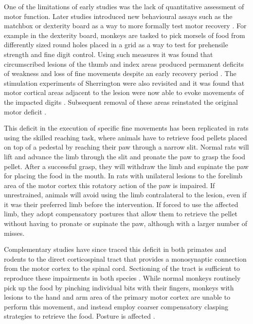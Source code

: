 One of the limitations of early studies was the lack of quantitative assessment of motor function. Later studies introduced new behavioural assays such as the matchbox or dexterity board as a way to more formally test motor recovery \cite{Glees1950,Cole1952}. For example in the dexterity board, monkeys are tasked to pick morsels of food from differently sized round holes placed in a grid as a way to test for prehensile strength and fine digit control. Using such measures it was found that circumscribed lesions of the thumb and index areas produced permanent deficits of weakness and loss of fine movements despite an early recovery period \cite{Glees1950}. The stimulation experiments of Sherrington were also revisited and it was found that motor cortical areas adjacent to the lesion were now able to evoke movements of the impacted digits \cite{Glees1950}. Subsequent removal of these areas reinstated the original motor deficit \cite{Glees1950}.

This deficit in the execution of specific fine movements has been replicated in rats using the skilled reaching task, where animals have to retrieve food pellets placed on top of a pedestal by reaching their paw through a narrow slit. Normal rats will lift and advance the limb through the slit and pronate the paw to grasp the food pellet. After a successful grasp, they will withdraw the limb and supinate the paw for placing the food in the mouth. In rats with unilateral lesions to the forelimb area of the motor cortex this rotatory action of the paw is impaired. If unrestrained, animals will avoid using the limb contralateral to the lesion, even if it was their preferred limb before the intervention. If forced to use the affected limb, they adopt compensatory postures that allow them to retrieve the pellet without having to pronate or supinate the paw, although with a larger number of misses.

Complementary studies have since traced this deficit in both primates and rodents to the direct corticospinal tract that provides a monosynaptic connection from the motor cortex to the spinal cord. Sectioning of the tract is sufficient to reproduce these impairments in both species \cite{Lawrence1968}. While normal monkeys routinely pick up the food by pinching individual bits with their fingers, monkeys with lesions to the hand and arm area of the primary motor cortex are unable to perform this movement, and instead employ coarser compensatory clasping strategies to retrieve the food. Posture is affected \cite{Lashley1924}.


